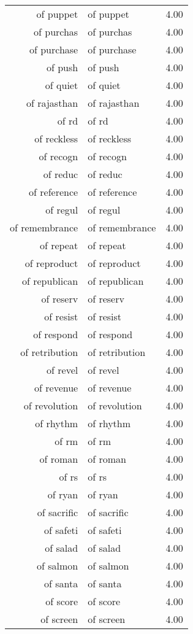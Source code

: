 \begin{table}[ht]
\begin{tabular}{rlr}
  of puppet & of puppet & 4.00 \\ 
  of purchas & of purchas & 4.00 \\ 
  of purchase & of purchase & 4.00 \\ 
  of push & of push & 4.00 \\ 
  of quiet & of quiet & 4.00 \\ 
  of rajasthan & of rajasthan & 4.00 \\ 
  of rd & of rd & 4.00 \\ 
  of reckless & of reckless & 4.00 \\ 
  of recogn & of recogn & 4.00 \\ 
  of reduc & of reduc & 4.00 \\ 
  of reference & of reference & 4.00 \\ 
  of regul & of regul & 4.00 \\ 
  of remembrance & of remembrance & 4.00 \\ 
  of repeat & of repeat & 4.00 \\ 
  of reproduct & of reproduct & 4.00 \\ 
  of republican & of republican & 4.00 \\ 
  of reserv & of reserv & 4.00 \\ 
  of resist & of resist & 4.00 \\ 
  of respond & of respond & 4.00 \\ 
  of retribution & of retribution & 4.00 \\ 
  of revel & of revel & 4.00 \\ 
  of revenue & of revenue & 4.00 \\ 
  of revolution & of revolution & 4.00 \\ 
  of rhythm & of rhythm & 4.00 \\ 
  of rm & of rm & 4.00 \\ 
  of roman & of roman & 4.00 \\ 
  of rs & of rs & 4.00 \\ 
  of ryan & of ryan & 4.00 \\ 
  of sacrific & of sacrific & 4.00 \\ 
  of safeti & of safeti & 4.00 \\ 
  of salad & of salad & 4.00 \\ 
  of salmon & of salmon & 4.00 \\ 
  of santa & of santa & 4.00 \\ 
  of score & of score & 4.00 \\ 
  of screen & of screen & 4.00 \\ 

\end{tabular}
\end{table}
